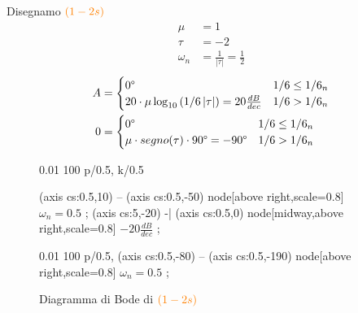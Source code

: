 \documentclass[a4paper]{article}
\begin{document}
\begin{example}
    \vspace{1em}
    \noindent
    Disegnamo \( \color{orange} \left( 1 - 2s \right)  \)
    \[
    \begin{aligned}
      \mu &= 1\\
      \tau &= -2\\
      \omega_n &= \frac{1}{|\tau|} = \frac{1}{2}
    \end{aligned}
    \] 
    \[
    \begin{aligned}
      A &= \begin{cases}
        0\degree & 1/6 \le 1/6_n\\
        20 \cdot \mu \log_{10} \left( 1/6 \left| \tau \right|  \right) = 20 \frac{dB}{dec} & 1/6 > 1/6_n
      \end{cases}\\
        0 &= \begin{cases}
          0\degree & 1/6 \le 1/6_n\\
          \mu \cdot segno(\tau) \cdot 90\degree = -90\degree & 1/6 > 1/6_n
        \end{cases}
    \end{aligned}
    \] 
    \begin{figure}[H]
      \centering
      \begin{BodeMagPlot}[scale=1.5,ytick distance=20,ylabel={Ampiezza (dB)},xlabel={}] {0.01} {100}
        {
          p/{0.5},
          k/0.5
        }

         (axis cs:0.5,10) -- (axis cs:0.5,-50) node[above right,scale=0.8] {\( \omega_n = 0.5 \) };
         (axis cs:5,-20) -| (axis cs:0.5,0) 
        node[midway,above right,scale=0.8] {\( -20 \frac{dB}{dec} \) };
      \end{BodeMagPlot}

      \begin{BodePhPlot}[
        scale=1.5,ytick distance=90,ylabel={Fase (deg)},xlabel={Frequenza (rad/s)},
        ] {0.01} {100}
        {
          p/{0.5},
        }
         (axis cs:0.5,-80) -- (axis cs:0.5,-190) node[above right,scale=0.8] {\( \omega_n = 0.5 \) };
      \end{BodePhPlot}
      \caption{Diagramma di Bode di \( \color{orange} \left( 1 - 2s \right)  \)}
    \end{figure}
\end{example}
\end{document}
